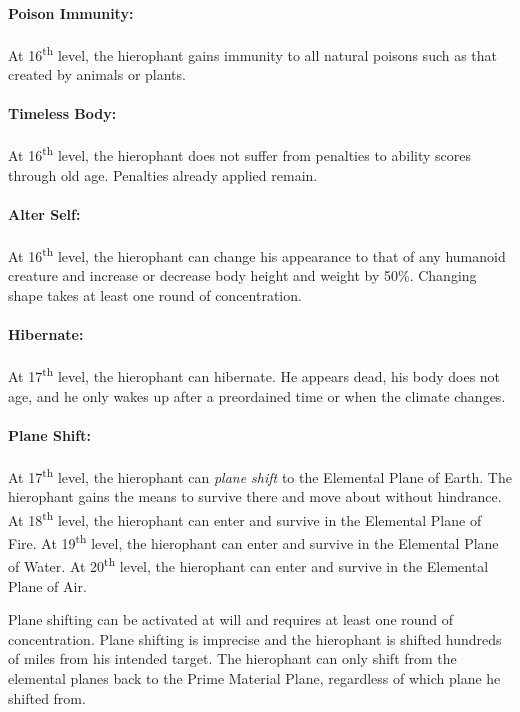 \begin{multicols}{2}
\paragraph{Poison Immunity:} At 16\textsuperscript{th} level, the hierophant gains immunity to all natural poisons such as that created by animals or plants.

\paragraph{Timeless Body:} At 16\textsuperscript{th} level, the hierophant does not suffer from penalties to ability scores through old age.  Penalties already applied remain.

\paragraph{Alter Self:} At 16\textsuperscript{th} level, the hierophant can change his appearance to that of any humanoid creature and increase or decrease body height and weight by 50\%.  Changing shape takes at least one round of concentration.

\paragraph{Hibernate:} At 17\textsuperscript{th} level, the hierophant can hibernate.  He appears dead, his body does not age, and he only wakes up after a preordained time or when the climate changes.

\paragraph{Plane Shift:} At 17\textsuperscript{th} level, the hierophant can \textit{plane shift} to the Elemental Plane of Earth.  The hierophant gains the means to survive there and move about without hindrance.  At 18\textsuperscript{th} level, the hierophant can enter and survive in the Elemental Plane of Fire.  At 19\textsuperscript{th} level, the hierophant can enter and survive in the Elemental Plane of Water.  At 20\textsuperscript{th} level, the hierophant can enter and survive in the Elemental Plane of Air.  

Plane shifting can be activated at will and requires at least one round of concentration.  Plane shifting is imprecise and the hierophant is shifted hundreds of miles from his intended target.  The hierophant can only shift from the elemental planes back to the Prime Material Plane, regardless of which plane he shifted from.


\end{multicols}

